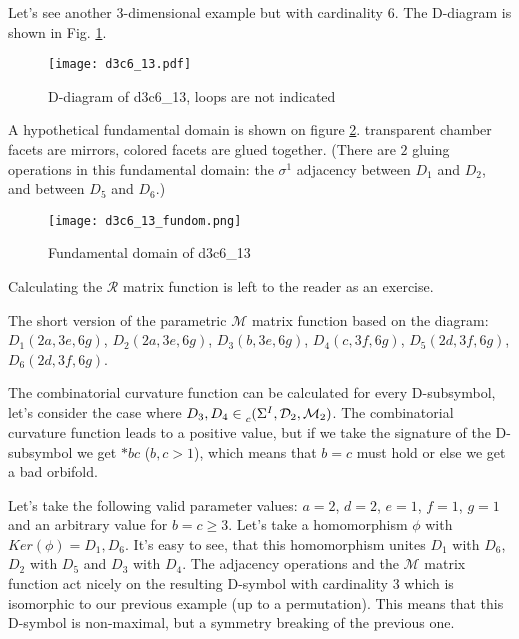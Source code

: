 \documentclass[12pt,a4paper]{article}
\numberwithin{equation}{section}
\newcommand{\leftsub}[2]{{\vphantom{#2}}_{#1}{#2}}
\theoremstyle{plain}%
\theoremstyle{definition}
\theoremstyle{remark}
\begin{document}






Let's see another $3$-dimensional example but with cardinality $6$. The
D-diagram is shown in Fig.
\ref{fig:d3c6_13}.

\begin{figure}
  \caption{\label{fig:d3c6_13} D-diagram of d3c6\_13, loops are not indicated}
  \center
  \texttt{[image: d3c6\_13.pdf]}
\end{figure}

A hypothetical fundamental domain is shown on figure \ref{fig:d3c6_13_fundom}.
transparent chamber facets are mirrors, colored facets are glued together.
(There are $2$ gluing operations in this fundamental domain: the $\sigma^1$ adjacency between
$D_1$ and $D_2$, and between $D_5$ and $D_6$.)

\begin{figure}
  \caption{\label{fig:d3c6_13_fundom} Fundamental domain of d3c6\_13}
  \center
  \texttt{[image: d3c6\_13\_fundom.png]}
\end{figure}

Calculating the $\mathcal{R}$ matrix function is left to the reader as an
exercise.

The short version of the parametric $\mathcal{M}$ matrix function based on the
diagram: $D_1(2a, 3e, 6g)$, $D_2(2a, 3e, 6g)$, $D_3(b, 3e, 6g)$, $D_4(c, 3f,
6g)$, $D_5(2d, 3f, 6g)$, $D_6(2d, 3f, 6g)$.

The combinatorial curvature function can be calculated for every D-subsymbol,
let's consider the case where
$D_3,D_4\in\leftsub{c}{(\Sigma^I,\mathcal{D}_2,\mathcal{M}_2)}$. The combinatorial
curvature function leads to a positive value, but if we take the signature of
the D-subsymbol we get $*bc$ ($b,c>1$), which means that $b=c$ must hold or else
we get a bad orbifold.

Let's take the following valid parameter values: $a=2$, $d=2$, $e=1$, $f=1$, $g=1$ and
an arbitrary value for $b=c\geq3$. Let's take a homomorphism $\phi$ with
$Ker(\phi)={D_1,D_6}$. It's easy to see, that this homomorphism unites $D_1$
with $D_6$, $D_2$ with $D_5$ and $D_3$ with $D_4$. The adjacency operations and
the $\mathcal{M}$ matrix function act nicely on the resulting D-symbol
with cardinality $3$ which is isomorphic to our previous example (up to a
permutation). This means that this D-symbol is non-maximal, but a symmetry
breaking of the previous one.
\end{document}
